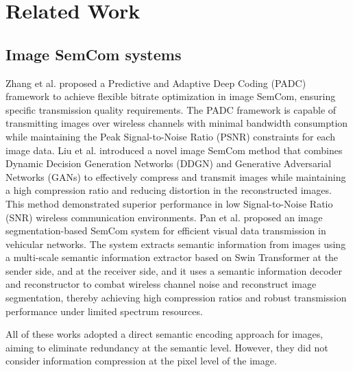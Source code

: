 \section{Related Work}
\subsection{Image SemCom systems}
Zhang et al. \cite{zhang2023predictive} proposed a Predictive and Adaptive Deep Coding (PADC) framework to achieve flexible bitrate optimization in image SemCom, ensuring specific transmission quality requirements. The PADC framework is capable of transmitting images over wireless channels with minimal bandwidth consumption while maintaining the Peak Signal-to-Noise Ratio (PSNR) constraints for each image data. 
Liu et al. \cite{liu2024novel} introduced a novel image SemCom method that combines Dynamic Decision Generation Networks (DDGN) and Generative Adversarial Networks (GANs) to effectively compress and transmit images while maintaining a high compression ratio and reducing distortion in the reconstructed images. This method demonstrated superior performance in low Signal-to-Noise Ratio (SNR) wireless communication environments. 
Pan et al. \cite{pan2023image} proposed an image segmentation-based SemCom system for efficient visual data transmission in vehicular networks. The system extracts semantic information from images using a multi-scale semantic information extractor based on Swin Transformer at the sender side, and at the receiver side, and it uses a semantic information decoder and reconstructor to combat wireless channel noise and reconstruct image segmentation, thereby achieving high compression ratios and robust transmission performance under limited spectrum resources.

All of these works adopted a direct semantic encoding approach for images, aiming to eliminate redundancy at the semantic level. However, they did not consider information compression at the pixel level of the image.

